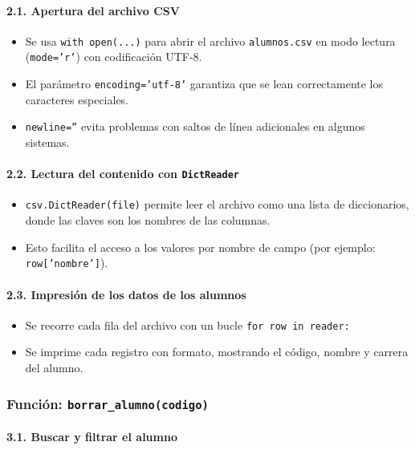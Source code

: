 \documentclass[12pt]{article}
\begin{document}
{\paragraph{2.1. Apertura del archivo CSV}
\begin{itemize}
    \item Se usa \texttt{with open(...)} para abrir el archivo \texttt{alumnos.csv} en modo lectura (\texttt{mode='r'}) con codificación UTF-8.
    \item El parámetro \texttt{encoding='utf-8'} garantiza que se lean correctamente los caracteres especiales.
    \item \texttt{newline=''} evita problemas con saltos de línea adicionales en algunos sistemas.
\end{itemize}

\paragraph{2.2. Lectura del contenido con \texttt{DictReader}}
\begin{itemize}
    \item \texttt{csv.DictReader(file)} permite leer el archivo como una lista de diccionarios, donde las claves son los nombres de las columnas.
    \item Esto facilita el acceso a los valores por nombre de campo (por ejemplo: \texttt{row['nombre']}).
\end{itemize}

\paragraph{2.3. Impresión de los datos de los alumnos}
\begin{itemize}
    \item Se recorre cada fila del archivo con un bucle \texttt{for row in reader:}
    \item Se imprime cada registro con formato, mostrando el código, nombre y carrera del alumno.
\end{itemize}

\subsubsection{Función: \texttt{borrar\_alumno(codigo)}}

\paragraph{3.1. Buscar y filtrar el alumno}

}
\end{document}
